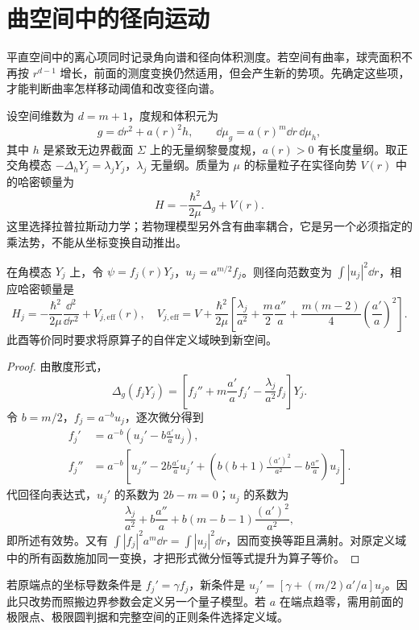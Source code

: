 \section{曲空间中的径向运动}
\label{sec:phys-ghs-geometric-radial}

平直空间中的离心项同时记录角向谱和径向体积测度。若空间有曲率，球壳面积不再按 $r^{d-1}$ 增长，前面的测度变换仍然适用，但会产生新的势项。先确定这些项，才能判断曲率怎样移动阈值和改变径向谱。

设空间维数为 $d=m+1$，度规和体积元为
\[
g=\dd r^2+a(r)^2h,\qquad
\dd\mu_g=a(r)^m\dd r\,\dd\mu_h,
\]
其中 $h$ 是紧致无边界截面 $\Sigma$ 上的无量纲黎曼度规，$a(r)>0$ 有长度量纲。取正交角模态 $-\Delta_hY_j=\lambda_jY_j$，$\lambda_j$ 无量纲。质量为 $\mu$ 的标量粒子在实径向势 $V(r)$ 中的哈密顿量为
\[
H=-\frac{\hbar^2}{2\mu}\Delta_g+V(r).
\]
这里选择拉普拉斯动力学；若物理模型另外含有曲率耦合，它是另一个必须指定的乘法势，不能从坐标变换自动推出。

\begin{proposition}[含测度的酉径向约化]
\label{prop:phys-ghs-warped-radial}
在角模态 $Y_j$ 上，令 $\psi=f_j(r)Y_j$，$u_j=a^{m/2}f_j$。则径向范数变为 $\int|u_j|^2\dd r$，相应哈密顿量是
\begin{equation}
H_j=-\frac{\hbar^2}{2\mu}\frac{\dd^2}{\dd r^2}+V_{j,\mathrm{eff}}(r),
\quad
V_{j,\mathrm{eff}}=V+\frac{\hbar^2}{2\mu}
\left[\frac{\lambda_j}{a^2}+\frac m2\frac{a''}{a}
+\frac{m(m-2)}4\left(\frac{a'}a\right)^2\right].
\label{eq:phys-ghs-warped-potential}
\end{equation}
此酉等价同时要求将原算子的自伴定义域映到新空间。
\end{proposition}
\begin{proof}
由散度形式，
\[
\Delta_g(f_jY_j)=\left[f_j''+m\frac{a'}a f_j'
-\frac{\lambda_j}{a^2}f_j\right]Y_j.
\]
令 $b=m/2$，$f_j=a^{-b}u_j$，逐次微分得到
\begin{align*}
f_j'&=a^{-b}\left(u_j'-b\frac{a'}a u_j\right),\\
f_j''&=a^{-b}\left[u_j''-2b\frac{a'}a u_j'
+\left(b(b+1)\frac{(a')^2}{a^2}-b\frac{a''}a\right)u_j\right].
\end{align*}
代回径向表达式，$u_j'$ 的系数为 $2b-m=0$；$u_j$ 的系数为
\[
\frac{\lambda_j}{a^2}+b\frac{a''}a
+b(m-b-1)\frac{(a')^2}{a^2},
\]
即所述有效势。又有 $\int|f_j|^2a^m\dd r=\int|u_j|^2\dd r$，因而变换等距且满射。对原定义域中的所有函数施加同一变换，才把形式微分恒等式提升为算子等价。
\end{proof}

若原端点的坐标导数条件是 $f_j'=\gamma f_j$，新条件是 $u_j'=[\gamma+(m/2)a'/a]u_j$。因此只改势而照搬边界参数会定义另一个量子模型。若 $a$ 在端点趋零，需用前面的极限点、极限圆判据和完整空间的正则条件选择定义域。


